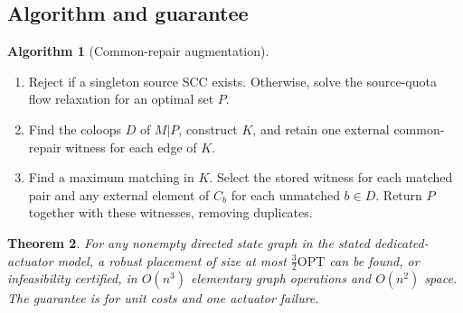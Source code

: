 \documentclass[11pt]{article}
\newtheorem{theorem}{Theorem}[section]
\theoremstyle{definition}
\newtheorem{algorithm}[theorem]{Algorithm}
\theoremstyle{remark}\newtheorem{remark}[theorem]{Remark}
\newcommand{\OPT}{\mathrm{OPT}}
\begin{document}
\subsection{Algorithm and guarantee}
\begin{algorithm}[Common-repair augmentation]\label{alg:repair}
\begin{enumerate}[label=\arabic*.,leftmargin=*]
\item Reject if a singleton source SCC exists. Otherwise, solve the
source-quota flow relaxation for an optimal set $P$.
\item Find the coloops $D$ of $M|P$, construct $K$, and retain one
external common-repair witness for each edge of $K$.
\item Find a maximum matching in $K$. Select the stored witness for each
matched pair and any external element of $C_b$ for each unmatched
$b\in D$. Return $P$ together with these witnesses, removing duplicates.
\end{enumerate}
\end{algorithm}
\begin{theorem}\label{thm:three-halves}
For any nonempty directed state graph in the stated dedicated-actuator
model, a robust placement of size at most $\tfrac32\OPT$ can be found, or
infeasibility certified, in $O(n^3)$ elementary graph operations
and $O(n^2)$ space.
The guarantee is for unit costs and one actuator failure.
\end{theorem}
\end{document}
